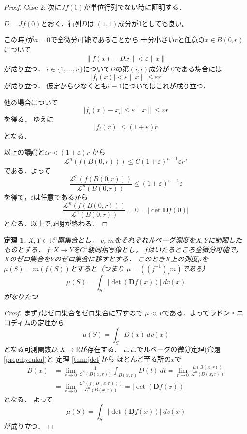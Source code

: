 \documentclass[leqno, a4paper, 12pt]{jsarticle}
\newtheorem{thm}{定理}
\newcommand{\rr}{\mathbb{R}}
\newcommand{\ep}{\varepsilon}
\newcommand{\ddd}{\mathbf{D}}
\begin{document}
\begin{proof}
Case 2: 次に$Jf(0)$が単位行列でない時に証明する．

$D=Jf(0)$とおく．行列$D$は
$(1,1)$成分が$0$としても良い。

この時$f$が$a=0$で全微分可能であることから
十分小さい$r$と任意の$x\in B(0, r)$について
\begin{align}\label{al:bibun}
\|f(x)-Dx\|<\ep \|x\|
\end{align}
が成り立つ．
$i\in \{1, \dots, n\}$について$D$の第$(i, i)$成分が
$0$である場合には
\[
|f_{i}(x)|<\ep\|x\|\le \ep r
\]
が成り立つ．
仮定から少なくとも$i=1$についてはこれが成り立つ．

他の場合について
\[
|f_i(x)-x_i|\le \ep \|x\|\le \ep r
\]
を得る．
ゆえに
\[
|f_i(x)|\le (1+\ep)r
\]
となる．


以上の議論と$\ep r<(1+\ep)r$
から
\[
\mathcal{L}^{n}(f(B(0,r)))\le C(1+\ep)^{n-1}\ep r^n
\]
である．よって
\[
\frac{\mathcal{L}^{n}(f(B(0,r)))}{\mathcal{L}^{n}(B(0,r))}\le (1+\ep)^{n-1}\ep
\]
を得て，$\ep$は任意であるから
\[
\frac{\mathcal{L}^{n}(f(B(0,r)))}{\mathcal{L}^{n}(B(0,r))}=0
=|\det \ddd f(0)|
\]
となる．以上で証明が終わる．
\end{proof}

\begin{thm}\label{thm:henhen}
$X, Y\subset \rr^n$開集合とし，
$v$, $m$をそれぞれルベーグ測度を$X,Y$に制限したものとする．
$f:X\to Y$を$C^{1}$級同相写像とし，
$f$はいたるところ全微分可能で，
$X$のゼロ集合を$Y$のゼロ集合に移すとする．
このとき$X$上の測度$\mu$を
$\mu(S)=m(f(S))$とすると（つまり
$\mu=((f^{-1})_{*}m)$である）
\[
\mu(S)=\int_{S}|\det(\ddd f(x))| \ dv(x)
\]
がなりたつ
\end{thm}
\begin{proof}
まず$f$はゼロ集合をゼロ集合に写すので
$\mu\ll v$である．よってラドン・ニコディムの定理から
\[
\mu(S)=\int_{S}D(x)\ dv(x)
\]
となる可測関数$D: X\to \rr$が存在する．
ここでルベーグの微分定理(命題 \ref{prop:hyouka})と
定理 \ref{thm:jdet}から
ほとんど至る所の$x$で
\begin{align*}
D(x)&=
\lim_{r\to 0}\frac{1}{\mathcal{L}^{n}(B(x,r))}\int_{B(x,r)} D(t)\ dt=
\lim_{r\to 0}\frac{\mu(B(x, r))}{\mathcal{L}^{n}(B(x,r))}
\\
&=
\lim_{r\to 0}\frac{\mathcal{L}^{n}(f(B(x, r)))}{\mathcal{L}^{n}(B(x,r))}
=|\det(\ddd f(x))|
\end{align*}
となる．
よって
\[
\mu(S)=\int_{S}|\det(\ddd f(x))| \ dv(x)
\]
が成り立つ．
\end{proof}
\end{document}

